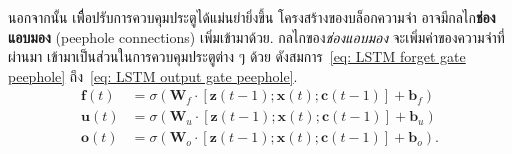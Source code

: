 นอกจากนั้น
เพืื่อปรับการควบคุมประตูได้แม่นยำยิ่งขึ้น
โครงสร้างของบล็อกความจำ อาจมีกลไก\textbf{ช่องแอบมอง}
(peephole connections\cite{GersEtAl2002}) เพิ่มเข้ามาด้วย.
กลไกของ\textit{ช่องแอบมอง} จะเพิ่มค่าของความจำที่ผ่านมา เข้ามาเป็นส่วนในการควบคุมประตูต่าง ๆ ด้วย
ดังสมการ~\ref{eq: LSTM forget gate peephole} ถึง~\ref{eq: LSTM output gate peephole}.
%
\begin{eqnarray}
\bm{f}(t) & = \sigma(\bm{W}_f \cdot [\bm{z}(t-1); \bm{x}(t); \bm{c}(t-1)] + \bm{b}_f) 
\label{eq: LSTM forget gate peephole} \\
\bm{u}(t) & = \sigma(\bm{W}_u \cdot [\bm{z}(t-1); \bm{x}(t); \bm{c}(t-1)] + \bm{b}_u) 
\label{eq: LSTM input gate peephole} \\
\bm{o}(t) & = \sigma(\bm{W}_o \cdot [\bm{z}(t-1); \bm{x}(t); \bm{c}(t-1)] + \bm{b}_o) 
\label{eq: LSTM output gate peephole}.
\end{eqnarray}







%
%
%
%

